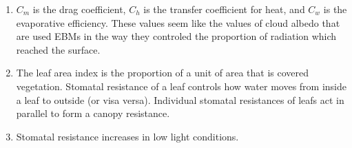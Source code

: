 \documentclass[11pt,oneside]{article}
\begin{document}
\begin{enumerate}
\item $C_m$ is the drag coefficient, $C_h$ is the transfer coefficient for heat, and $C_w$ is the evaporative efficiency. These values seem like the values of cloud albedo that are used EBMs in the way they controled the proportion of radiation which reached the surface. 

\item The leaf area index is the proportion of a unit of area that is covered vegetation. Stomatal resistance of a leaf controls how water moves from inside a leaf to outside (or visa versa).  Individual stomatal resistances of leafs act in parallel to form a canopy resistance. 

\item Stomatal resistance increases in low light conditions. 


\end{enumerate}
\end{document}
